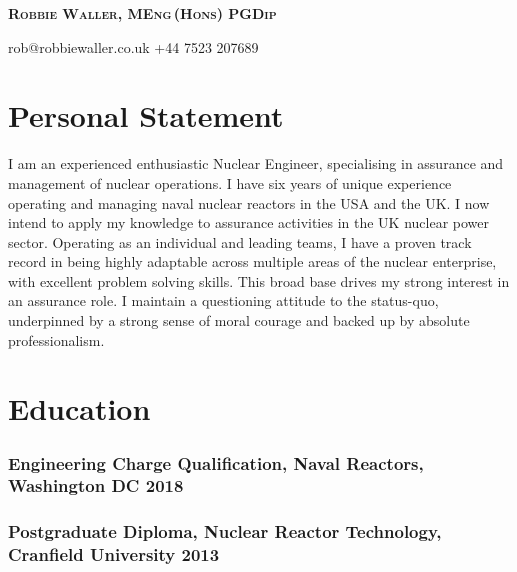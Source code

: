 \documentclass[a4paper, oneside, final, 11pt]{scrartcl} %
\begin{document}


{\fontsize{21}{21}\bfseries\scshape{Robbie Waller, MEng\,(Hons) PGDip}} %

\bigskip

\faEnvelopeO \space rob@robbiewaller.co.uk \hfill  \faMobile \space +44 7523 207689

\smallskip

\section{Personal Statement}

I am an experienced enthusiastic Nuclear Engineer, specialising in assurance and management of nuclear operations. I have six years of unique experience operating and managing naval nuclear reactors in the USA and the UK. I now intend to apply my knowledge to assurance activities in the UK nuclear power sector. Operating as an individual and leading teams, I have a proven track record in being highly adaptable across multiple areas of the nuclear enterprise, with excellent problem solving skills. This broad base drives my strong interest in an assurance role. I maintain a questioning attitude to the status-quo, underpinned by a strong sense of moral courage and backed up by absolute professionalism. 


\section{Education}

\subsubsection*{Engineering Charge Qualification,\textnormal{ Naval Reactors, Washington DC} \hfill 2018} 
\subsubsection*{Postgraduate Diploma, \textnormal{Nuclear Reactor Technology, Cranfield University} \hfill 2013}  
\end{document}
